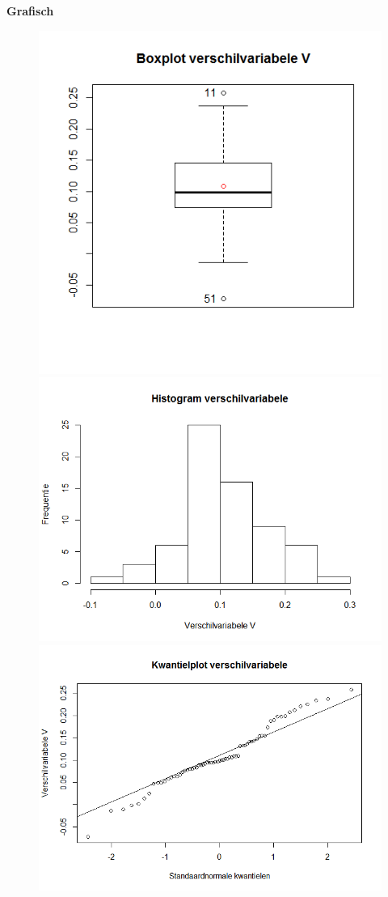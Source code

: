 \documentclass[11pt]{article}
\begin{document}
\textbf{Grafisch}
\begin{figure}[h!]
\centering
\includegraphics[scale=0.27]{data/Boxplot_verschilvariabele.png}
\includegraphics[scale=0.27]{data/histogram_verschilvariabele.png}
\includegraphics[scale=0.25]{data/kwantielplot_verschilvariabele.png}

\end{figure}
\end{document}

